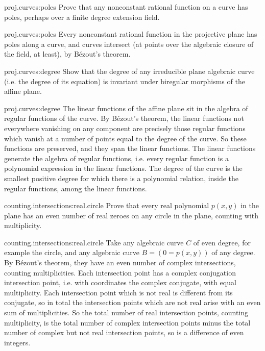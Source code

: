\begin{problem}{proj.curves:poles}
Prove that any nonconstant rational function on a curve has poles, perhaps over a finite degree extension field.
\end{problem}
\begin{answer}{proj.curves:poles}
Every nonconstant rational function in the projective plane has poles along a curve, and curves intersect (at points over the algebraic closure of the field, at least), by B\'ezout's theorem.
\end{answer}
\begin{problem}{proj.curves:degree}
Show that the degree of any irreducible plane algebraic curve (i.e. the degree of its equation) is invariant under biregular morphisms of the affine plane.
\end{problem}
\begin{answer}{proj.curves:degree}
The linear functions of the affine plane sit in the algebra of regular functions of the curve.
By B\'ezout's theorem, the linear functions not everywhere vanishing on any component are precisely those regular functions which vanish at a number of points equal to the degree of the curve.
So these functions are preserved, and they span the linear functions.
The linear functions generate the algebra of regular functions, i.e. every regular function is a polynomial expression in the linear functions.
The degree of the curve is the smallest positive degree for which there is a polynomial relation, inside the regular functions, among the linear functions.
\end{answer}
\begin{problem}{counting.intersections:real.circle}
Prove that every real polynomial \(p(x,y)\) in the plane has an even number of real zeroes on any circle in the plane, counting with multiplicity.
\end{problem}
\begin{answer}{counting.intersections:real.circle}
Take any algebraic curve \(C\) of even degree, for example the circle, and any algebraic curve \(B=(0=p(x,y))\) of any degree.
By B\'ezout's theorem, they have an even number of complex intersections, counting multiplicities.
Each intersection point has a complex conjugation intersection point, i.e. with coordinates the complex conjugate, with equal multiplicity.
Each intersection point which is not real is different from its conjugate, so in total the intersection points which are not real arise with an even sum of multiplicities.
So the total number of real intersection points, counting multiplicity, is the total number of complex intersection points minus the total number of complex but not real intersection points, so is a difference of even integers.
\end{answer}

